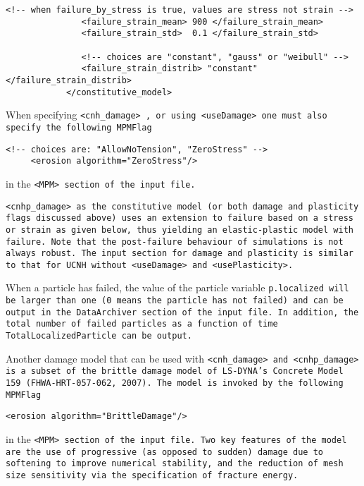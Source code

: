 \begin{enumerate}
\begin{Verbatim}[fontsize=\footnotesize]
               <!-- when failure_by_stress is true, values are stress not strain -->
               <failure_strain_mean> 900 </failure_strain_mean>
               <failure_strain_std>  0.1 </failure_strain_std>

               <!-- choices are "constant", "gauss" or "weibull" -->
               <failure_strain_distrib> "constant" </failure_strain_distrib>
            </constitutive_model>
\end{Verbatim}


When specifying \tt <cnh\_damage> \normalfont, or using \tt <useDamage> \normalfont one must also specify
the following MPMFlag
\begin{Verbatim}[fontsize=\footnotesize]
     <!-- choices are: "AllowNoTension", "ZeroStress" -->
     <erosion algorithm="ZeroStress"/>
\end{Verbatim}
in the \tt <MPM> \normalfont section of the input file.

\tt <cnhp\_damage> \normalfont as the constitutive model (or both damage and plasticity
 flags discussed above) uses an extension
to failure based on a stress or strain as given below, thus yielding an
elastic-plastic model with failure.  Note that the post-failure behaviour of
simulations is not always robust.  The input section for damage and plasticity is
similar to that for UCNH without \tt <useDamage> \normalfont and \tt <usePlasticity>. \normalfont

When a particle has failed, the value of the particle variable \tt p.localized \normalfont
will be larger than one (0 means the particle has not failed) and can be output in the \tt DataArchiver
\normalfont section of the input file. In addition, the total number of failed particles as
a function of time \tt TotalLocalizedParticle \normalfont can be output. 

Another damage model that can be used with \tt <cnh\_damage> \normalfont and
\tt <cnhp\_damage> \normalfont is a subset of the brittle damage model of LS-DYNA's Concrete
 Model 159 (FHWA-HRT-057-062, 2007). The model is invoked by the following MPMFlag
\begin{Verbatim}[fontsize=\footnotesize]
     <erosion algorithm="BrittleDamage"/>
\end{Verbatim}
in the \tt <MPM> \normalfont section of the input file. Two key features of the model are the use of
progressive (as opposed to sudden) damage due to softening to improve numerical stability, 
and the reduction of mesh size sensitivity via the specification of fracture energy. 


\end{enumerate}
